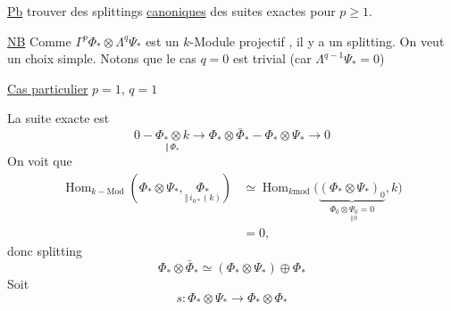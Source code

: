 \uline{Pb} trouver des splittings \uline{canoniques} des suites exactes
pour $p\geq1$.

\uline{NB} Comme $\Gamma^p\Phi_*\otimes\Lambda^q\Psi_*$ est un $k$-Module projectif ,
il y a un splitting. On veut un choix simple. Notons que le cas $q=0$ est trivial (car $\Lambda^{q-1}\Psi_*=0$)

\uline{Cas particulier} $p=1$, $q=1$

La suite exacte est
\[
0-\underset{\Vert\,\Phi_*}{\Phi_*\otimes k}
\longrightarrow\Phi_*\otimes\bar\Phi_*-\Phi_*\otimes\Psi_*\longrightarrow0
\]
On voit que
\[
\begin{aligned}
\operatorname{Hom}_{k-\mathrm{Mod}}(\Phi_*\otimes\Psi_*,
\underset{\Vert\,i_{0*}(k)}{\Phi_*})
&\simeq\operatorname{Hom}_{k\mathrm{mod}}
\bigl(\underbrace{(\Phi_*\otimes\Psi_*)_0}_{\Phi_0\otimes\underset{\Vert\,0}{\Psi_0}=0},k\bigr)\\
&=0,
\end{aligned}
\]
donc splitting 
\[
\Phi_*\otimes\bar\Phi_*\simeq(\Phi_*\otimes\Psi_*)\oplus\Phi_*
\]
Soit 
\[
s:\Phi_*\otimes\Psi_*\longrightarrow\Phi_*\otimes\Phi_*
\]
